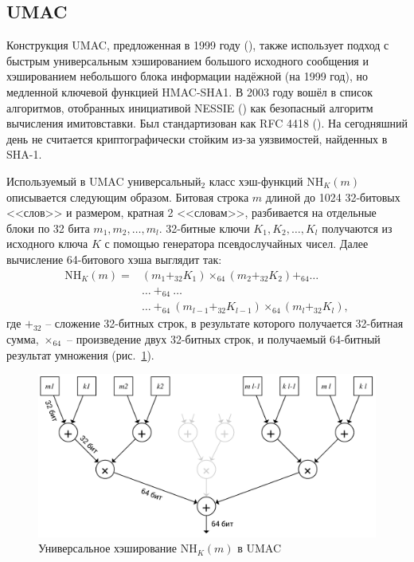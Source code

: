 \subsection{UMAC}\label{sec:umac}

Конструкция UMAC, предложенная в 1999 году (\cite{Black:Halevi:Krawczyk:etc:1999}), также использует подход с быстрым универсальным хэшированием большого исходного сообщения и хэшированием небольшого блока информации надёжной (на 1999 год), но медленной ключевой функцией HMAC-SHA1. В 2003 году вошёл в список алгоритмов, отобранных инициативой NESSIE () как безопасный алгоритм вычисления имитовставки. Был стандартизован как RFC 4418 (\cite{rfc4418}). На сегодняшний день не считается криптографически стойким из-за уязвимостей, найденных в SHA-1.

Используемый в UMAC универсальный$_2$ класс хэш-функций $\textrm{NH}_K (m)$ описывается следующим образом. Битовая строка $m$ длиной до 1024 32-битовых <<слов>> и размером, кратная 2 <<словам>>, разбивается на отдельные блоки по 32 бита $m_1, m_2, \dots, m_l$. 32-битные ключи $K_1, K_2, \dots, K_l$ получаются из исходного ключа $K$ с помощью генератора псевдослучайных чисел. Далее вычисление 64-битового хэша выглядит так: \[\begin{array}{ll}
    \textrm{NH}_K (m) = & ( m_1 +_{32}K_1) \times_{64} (m_2 +_{32} K_2) +_{64} \dots \\
                        & \dots ~ +_{64} ~ \dots \\
                        & \dots ~ +_{64} ~ (m_{l-1} +_{32} K_{l-1}) \times_{64} (m_l+_{32}K_l),
\end{array} \] где $+_{32}$ -- сложение 32-битных строк, в результате которого получается 32-битная сумма, $\times_{64}$ -- произведение двух 32-битных строк, и получаемый 64-битный результат умножения (рис.~\ref{fig:UMAC}).

\begin{figure}
    \centering
    \includegraphics[width=1\textwidth]{pic/UMAC}
    \caption{Универсальное хэширование $\textrm{NH}_K (m)$ в UMAC}
    \label{fig:UMAC}
\end{figure}

